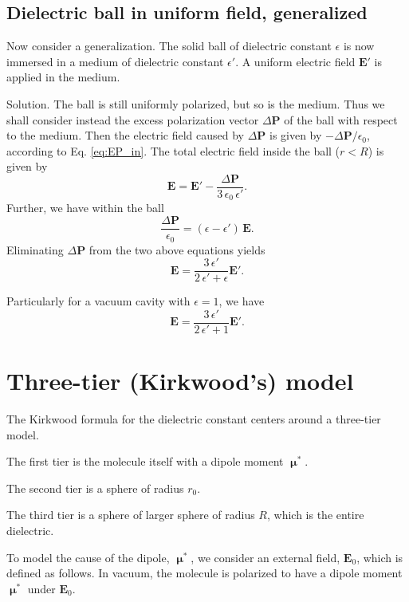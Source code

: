 \documentclass[11pt]{article}
\newcommand{\vct}[1]{\boldsymbol{\mathbf{#1}}}
\newcommand{\vE}{\vct{E}}
\newcommand{\vP}{\vct{P}}
\newcommand{\vmu}{\vct{\upmu}}
\begin{document}
\subsection{Dielectric ball in uniform field, generalized}



Now consider a generalization.
%
The solid ball of dielectric constant $\epsilon$
is now immersed in a medium of dielectric constant $\epsilon'$.
%
A uniform electric field $\vE'$ is applied in the medium.

Solution.
The ball is still uniformly polarized,
but so is the medium.
Thus we shall consider instead
the excess polarization vector $\Delta\vP$
of the ball with respect to the medium.
%
Then the electric field caused by $\Delta\vP$
is given by $-\Delta\vP/\epsilon_0$,
according to Eq. \eqref{eq:EP_in}.
The total electric field inside the ball ($r < R$) is given by
\[
  \vE = \vE' - \frac{ \Delta \vP } { 3 \, \epsilon_0 \, \epsilon' }.
\]
Further, we have within the ball
\[
  \frac{ \Delta \vP } { \epsilon_0 }
  = \left( \epsilon - \epsilon' \right) \, \vE.
\]
Eliminating $\Delta \vP$ from the two above equations yields
\begin{equation}
  \vE = \frac{ 3 \, \epsilon' } {2 \, \epsilon' + \epsilon} \vE'.
  \label{eq:Eplug_general}
\end{equation}

Particularly for a vacuum cavity with $\epsilon = 1$,
we have
\begin{equation}
  \vE = \frac{ 3 \, \epsilon' } {2 \, \epsilon' + 1} \vE'.
  \label{eq:Ehole}
\end{equation}





\section{Three-tier (Kirkwood's) model}



The Kirkwood formula for the dielectric constant centers around a three-tier model.


The first tier is the molecule itself with a dipole moment $\vmu^*$.

The second tier is a sphere of radius $r_0$.

The third tier is a sphere of larger sphere of radius $R$,
which is the entire dielectric.


To model the cause of the dipole, $\vmu^*$,
we consider an external field, $\vE_0$,
which is defined as follows.
%
In vacuum,
the molecule is polarized to have a dipole moment $\vmu^*$
under $\vE_0$.
\end{document}
